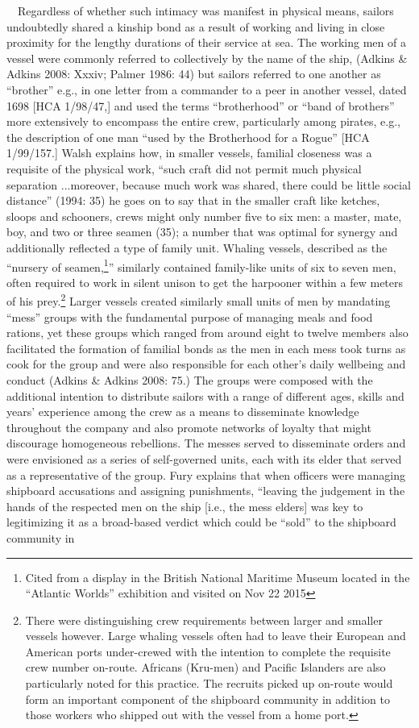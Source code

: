 \begin{styleStandard}
\ \ Regardless of whether such intimacy was manifest in physical means, sailors undoubtedly shared a kinship bond as a result of working and living in close proximity for the lengthy durations of their service at sea. The working men of a vessel were commonly referred to collectively by the name of the ship, (Adkins \& Adkins 2008: Xxxiv; Palmer 1986: 44) but sailors referred to one another as “brother” e.g., in one letter from a commander to a peer in another vessel, dated 1698 [HCA 1/98/47,] and used the terms “brotherhood” or “band of brothers” more extensively to encompass the entire crew, particularly among pirates, e.g., the description of one man “used by the Brotherhood for a Rogue” [HCA 1/99/157.] Walsh explains how, in smaller vessels, familial closeness was a requisite of the physical work, “such craft did not permit much physical separation ...moreover, because much work was shared, there could be little social distance” (1994: 35) he goes on to say that in the smaller craft like ketches, sloops and schooners, crews might only number five to six men: a master, mate, boy, and two or three seamen (35); a number that was optimal for synergy and additionally reflected a type of family unit. Whaling vessels, described as the “nursery of seamen,\footnote{ Cited from a display in the British National Maritime Museum located in the “Atlantic Worlds” exhibition and visited on Nov 22 2015}” similarly contained family-like units of six to seven men, often required to work in silent unison to get the harpooner within a few meters of his prey.\footnote{ There were distinguishing crew requirements between larger and smaller vessels however. Large whaling vessels often had to leave their European and American ports under-crewed with the intention to complete the requisite crew number on-route. Africans (Kru-men) and Pacific Islanders are also particularly noted for this practice. The recruits picked up on-route would form an important component of the shipboard community in addition to those workers who shipped out with the vessel from a home port. } Larger vessels created similarly small units of men by mandating “mess” groups with the fundamental purpose of managing meals and food rations, yet these groups which ranged from around eight to twelve members also facilitated the formation of familial bonds as the men in each mess took turns as cook for the group and were also responsible for each other’s daily wellbeing and conduct (Adkins \& Adkins 2008: 75.) The groups were composed with the additional intention to distribute sailors with a range of different ages, skills and years’ experience among the crew as a means to disseminate knowledge throughout the company and also promote networks of loyalty that might discourage homogeneous rebellions. The messes served to disseminate orders and were envisioned as a series of self-governed units, each with its elder that served as a representative of the group. Fury explains that when officers were managing shipboard accusations and assigning punishments, “leaving the judgement in the hands of the respected men on the ship [i.e., the mess elders] was key to legitimizing it as a broad-based verdict which could be “sold” to the shipboard community in 
\end{styleStandard}
